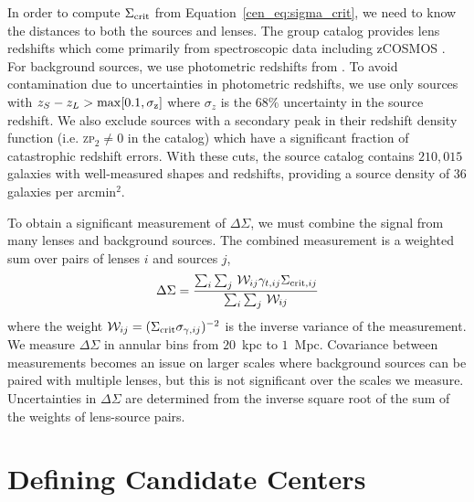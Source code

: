In order to compute $\Sigma_{\rm crit}$ from
Equation~\eqref{cen_eq:sigma_crit}, we need to know the distances to
both the sources and lenses. The group catalog provides lens redshifts which
come primarily from spectroscopic data including zCOSMOS \citep[][and
in prep.]{Lilly2009}. For background sources, we use photometric
redshifts from \citet{Ilbert2009}. To avoid contamination due to
uncertainties in photometric redshifts, we use only sources with
$z_S-z_L>\rm{max}[0.1,\sigma_{z}]$ where $\sigma_{z}$ is the $68\%$
uncertainty in the source redshift. We also exclude sources with a
secondary peak in their redshift density function (i.e. \textsc{zp}$_2
\neq 0$ in the \citealt{Ilbert2009} catalog) which have a significant
fraction of catastrophic redshift errors. With these cuts, the source
catalog contains $210,015$ galaxies with well-measured shapes and
redshifts, providing a source density of $36$ galaxies per arcmin$^2$.

To obtain a significant measurement of $\Delta\Sigma$, we must combine
the signal from many lenses and background sources. The combined
measurement is a weighted sum over pairs of lenses $i$ and sources
$j$,
\begin{equation}
\Delta\Sigma=\frac{\sum_i\sum_j\,\mathcal{W}_{ij}\gamma_{t,ij}\Sigma_{{\rm
      crit},ij}}{\sum_i\sum_j\,\mathcal{W}_{ij}}
\label{cen_eq:ds_weighted}
\end{equation}
where the weight $\mathcal{W}_{ij}=(\Sigma_{\rm crit}
\sigma_{\gamma,ij})^{-2}$ is the inverse variance of the measurement.
We measure $\Delta\Sigma$ in annular bins from $20$~{\rm kpc} to
$1$~{\rm Mpc}. Covariance between measurements becomes an issue on
larger scales where background sources can be paired with multiple
lenses, but this is not significant over the scales we
measure. Uncertainties in $\Delta\Sigma$ are determined from the
inverse square root of the sum of the weights of lens-source pairs.



\section{Defining Candidate Centers}
\label{cen_s:centers}

